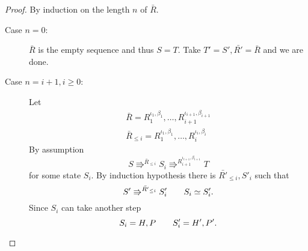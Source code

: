 \begin{proof}
  By induction on the length $n$ of $\bar{R}$.
  \begin{description}
    \item[Case $n = 0$:] $\bar{R}$ is the empty sequence and thus $S = T$. Take
      $T' = S', \bar{R'} = \bar{R}$ and we are done.
    \item[Case $n = i + 1, i \geq 0$:] Let
      \begin{equation*}
        \begin{gathered}
          \bar{R} = R_1^{\iota_1, \beta_1}, \dots, R_{i+1}^{\iota_{i+1},
          \beta_{i+1}} \\
          \bar{R}_{\leq i} = R_1^{\iota_1, \beta_1}, \dots, R_{i}^{\iota_{i},
          \beta_{i}}
        \end{gathered}
      \end{equation*}
      By assumption
      \begin{equation*}
        S \Rrightarrow^{\bar{R}_{\leq i}} S_i \Rrightarrow^{R_{i+1}^{\iota_{i+1},
        \beta_{i+1}}} T
      \end{equation*}
      for some state $S_i$. By induction hypothesis there is $\bar{R'}_{\leq i}, S'_i$
      such that
      \begin{equation}
        S' \Rrightarrow^{\bar{R'}_{\leq i}} S'_i \quad\quad S_i \simeq S'_i.
      \end{equation}
      Since $S_i$ can take another step
      \begin{equation*}
        S_i = H, P \quad\quad S'_i = H', P'.
      \end{equation*}
      

\end{description}
\end{proof}
